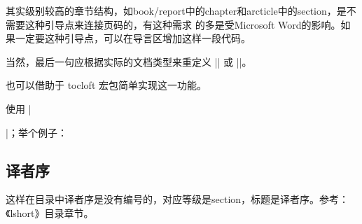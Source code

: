 

其实级别较高的章节结构，如book/report中的chapter和arcticle中的section，是不需要这种引导点来连接页码的，有这种需求
的多是受Microsoft Word的影响。如果一定要这种引导点，可以在导言区增加这样一段代码。
\begin{texlist}
  \makeatletter
  \def\@bfdottedtocline#1#2#3#4#5{%
  \ifnum #1>\c@tocdepth \else
  \vskip \z@ \@plus.2\p@
  {\leftskip #2\relax \rightskip \@tocrmarg \parfillskip -\rightskip
  \parindent #2\relax\@afterindenttrue
  \interlinepenalty\@M
  \leavevmode \bfseries
  \@tempdima #3\relax
  \advance\leftskip \@tempdima \null\nobreak\hskip -\leftskip
  {#4}\normalfont\nobreak
  \leaders\hbox{$\m@th
  \mkern \@dotsep mu\hbox{.}\mkern \@dotsep
  mu$}\hfill
  \nobreak
  \hb@xt@\@pnumwidth{\hfil\normalfont \normalcolor #5}%
  \par}%
  \fi}
  \renewcommand*\l@section{\@bfdottedtocline{0}{0em}{1.5em}}
  \makeatother
\end{texlist}
当然，最后一句应根据实际的文档类型来重定义 |\l@chapter| 或 |\l@section|。

也可以借助于 tocloft 宏包简单实现这一功能。
\begin{texlist}
\usepackage{tocloft}
\renewcommand{\cftsecleader}{\cftdotfill{\cftdotsep}} %
\end{texlist}





使用 ||；举个例子：
\begin{texlist}
  \section*{译者序}
\end{texlist}
这样在目录中译者序是没有编号的，对应等级是section，标题是译者序。参考：《lshort》目录章节。

